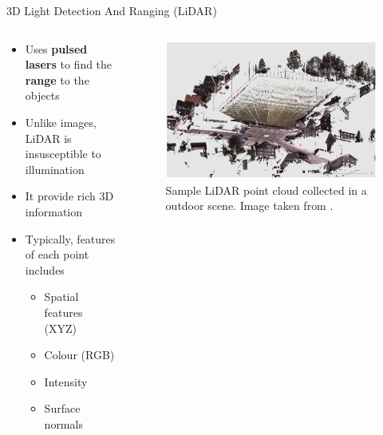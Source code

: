 \documentclass[aspectratio=169]{beamer}
\begin{document}
\begin{frame}{3D Light Detection And Ranging (LiDAR)}
    \begin{columns}
       \begin{column}{0.5\textwidth}
            \begin{itemize}
                \item Uses \textbf{pulsed lasers} to find the  \textbf{range} to the objects
                \item Unlike images, LiDAR is insusceptible to illumination 
                \item It provide rich 3D information
                \item Typically, features of each point includes
                \begin{itemize}
                    \item Spatial features (XYZ)
                    \item Colour (RGB)
                    \item Intensity
                    \item Surface normals
                \end{itemize}
            \end{itemize}
       \end{column}
       \begin{column}{0.5\textwidth}
            \begin{figure}
                \centering
                \includegraphics[scale=0.25]{images/sample_LiDAR_PC.jpg}
                \caption{Sample LiDAR point cloud collected in a outdoor scene. Image taken from \cite{hackel2017semantic3d}.}
                \label{fig:sample_lidar_pc}
            \end{figure}
       \end{column}
    \end{columns}
\end{frame}
\end{document}
